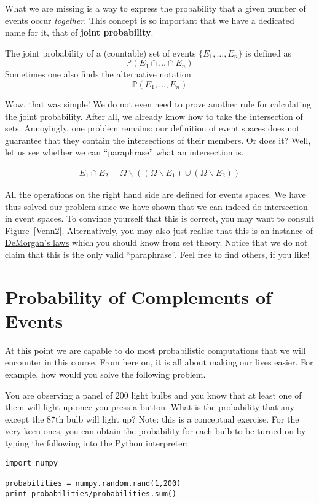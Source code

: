 What we are missing is a way to express the probability that a given number of events occur 
\textit{together}. This concept is so important that we have a dedicated name for it, that of 
\textbf{joint probability}.

\begin{Definition} \label{def:jointprob}
The joint probability of a (countable) set of events $ \{E_{1}, \ldots, E_{n}\} $ is defined as
$$ \mathbb{P}(E_{1} \cap \ldots \cap E_{n}) $$
Sometimes one also finds the alternative notation 
$$ \mathbb{P}(E_{1}, \ldots, E_{n}) $$
\end{Definition}

Wow, that was simple! We do not even need to prove another rule for calculating the joint probability.
After all, we already know how to take the intersection of sets. Annoyingly, one problem remains: our
definition of event spaces does not guarantee that they contain the intersections of their members. Or does 
it? Well, let us see whether we can ``paraphrase'' what an intersection is.

\begin{align}
E_{1} \cap E_{2} = \Omega \backslash ((\Omega \backslash E_{1}) \cup (\Omega \backslash E_{2}))
\end{align}

All the operations on the right hand side are defined for events spaces. We have thus solved our problem since
we have shown that we can indeed do intersection in event spaces.
To convince yourself that this is correct, you may want to consult Figure~\ref{Venn2}. Alternatively, you
may also just realise that this is an instance of \href{https://en.wikipedia.org/wiki/De_Morgan's_laws}
{DeMorgan's laws} which you should know from set theory. Notice that we do not claim that this is the only 
valid ``paraphrase''. Feel free to find others, if you like!




\section{Probability of Complements of Events}
At this point we are capable to do most probabilistic computations that we will encounter in this course.
From here on, it is all about making our lives easier. For example, how would you solve the following 
problem.

\begin{Exercise}
You are observing a panel of 200 light bulbs and you know that at least one of them will light up once you 
press a button. What is the probability that any except the 87th bulb will light up? Note: this is a 
conceptual exercise. For the very keen ones, you can obtain the probability for each bulb to be turned on
by typing the following into the Python interpreter:

\begin{lstlisting}
import numpy

probabilities = numpy.random.rand(1,200)
print probabilities/probabilities.sum()
\end{lstlisting} 
\end{Exercise}

